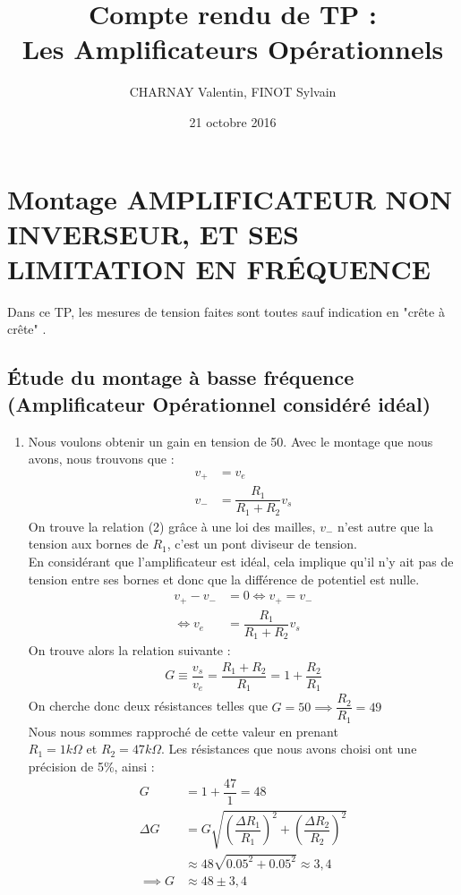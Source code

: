 \documentclass[11pt,a4paper]{article}
\date{21 octobre 2016}
\author{CHARNAY Valentin, FINOT Sylvain}
\title{Compte rendu de TP : \\ Les Amplificateurs Opérationnels}
\begin{document}
\maketitle
\section{Montage AMPLIFICATEUR NON INVERSEUR, ET SES LIMITATION EN FRÉQUENCE}

Dans ce TP, les mesures de tension faites sont toutes sauf indication en "crête à crête" .

\subsection{Étude du montage à basse fréquence (Amplificateur Opérationnel considéré idéal)}
\begin{enumerate}
\item Nous voulons obtenir un gain en tension de 50. Avec le montage que nous avons, nous trouvons que : 
\begin{align}
v_{+}&=v_{e}\\
v_{-}&=\dfrac {R_{1}} {R_{1}+R_{2}}v_{s}
\end{align}
On trouve la relation (2) grâce à une loi des mailles, $v_{-}$ n'est autre que la tension aux bornes de $R_{1}$, c'est un pont diviseur de tension. \\
En considérant que l'amplificateur est idéal, cela implique qu'il n'y ait pas de tension entre ses bornes et donc que la différence de potentiel est nulle.
\begin{align*}
v_{+}-v_{-}&=0 \iff v_{+}=v_{-} \\
\iff v_{e}&=\dfrac {R_{1}} {R_{1}+R_{2}}v_{s}
\end{align*}
On trouve alors la relation suivante :
\begin{align*}
G\equiv\dfrac{v_{s}}{v_{e}}=\dfrac {R_{1}+R_{2}} {R_{1}}=1+\dfrac {R_{2}} {R_{1}}
\end{align*}
On cherche donc deux résistances telles que $G=50 \implies \dfrac {R_{2}} {R_{1}}=49$ \\
Nous nous sommes rapproché de cette valeur en prenant \\ $R_{1}=1k\varOmega$ et $R_{2}=47k\varOmega$. Les résistances que nous avons choisi ont une précision de 5\%, ainsi :
\begin{align*}
G&=1+\dfrac{47}{1}=48\\
\Delta G&=G\sqrt {\left( \dfrac {\Delta R_{1}} {R_{1}}\right) ^{2}+\left( \dfrac {\Delta R_{2}} {R_{2}}\right) ^{2}}\\
&\approx 48\sqrt { 0.05^{2}+0.05 ^{2}} \approx 3,4 \\
\implies G& \approx 48\pm3,4
\end{align*}


\end{enumerate}
\end{document}
